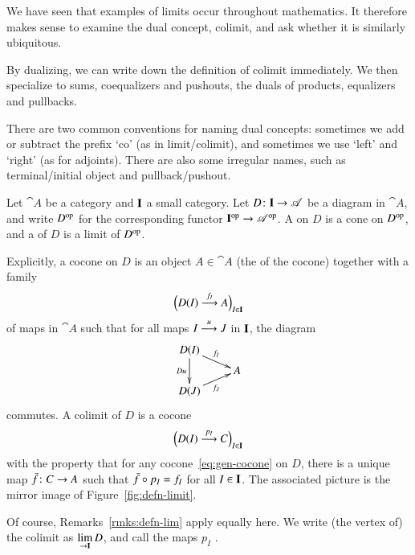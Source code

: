 We have seen that examples of limits occur throughout mathematics.  It
therefore makes sense to examine the dual concept, colimit, and ask whether
it is similarly ubiquitous.

By dualizing, we can write down the definition of colimit immediately.  We
then specialize to sums, coequalizers and pushouts, the duals of products,
equalizers and pullbacks.

There are two common conventions for naming dual%
%
%
concepts: sometimes we add or subtract the prefix `co' (as in
limit/colimit), and sometimes we use `left' and `right' (as for adjoints).
There are also some irregular names, such as terminal/initial object and
pullback/pushout.

\begin{defn}
Let $\cat{A}$ be a category and $\mathbf{I}$ a small category.  Let $D\from
\scat{I} \to \cat{A}$ be a diagram in $\cat{A}$, and write $D^{\mathrm{op}}$ for the
corresponding functor $\mathbf{I}^{\mathrm{op}} \to \mathscr{A}^{\mathrm{op}}$.  A %
%
%
on $D$ is a cone on $D^{\mathrm{op}}$, and a %
%
%
of $D$ is a limit of $D^{\mathrm{op}}$.
\end{defn}

Explicitly, a cocone on $D$ is an object $A \in \cat{A}$ (the
%
%
%
of the cocone) together with a family
%
\begin{equation}
\label{eq:gen-cocone}
\Bigl(
D(I) \stackrel{f_I}{\longrightarrow} A
\Bigr)_{I \in \mathbf{I}}
\end{equation}
%
of maps in $\cat{A}$ such that for all maps $I \stackrel{u}{\longrightarrow} J$ in $\mathbf{I}$, the
diagram
\[
\xymatrix@R=1ex{
D(I) \ar[dd]_{Du} \ar[rd]^{f_I} &       \\
                                &A      \\
D(J) \ar[ru]_{f_J}
}
\]
commutes.  A colimit of $D$ is a cocone
\[
\Bigl(D(I) \stackrel{p_I}{\longrightarrow} C\Bigr)_{I \in \mathbf{I}}
\]
with the property that for any cocone~\eqref{eq:gen-cocone} on
$D$, there is a unique map $\bar{f}\from C \to A$%
%
%
such that $\bar{f} \mathbin{\circ} p_I = f_I$ for all $I \in \mathbf{I}$.  The associated
picture is the mirror image of Figure~\ref{fig:defn-limit}.

Of course, Remarks~\ref{rmks:defn-lim} apply equally here.  We write (the
vertex of) the colimit as $\lim\limits_{\rightarrow \mathbf{I}} D$,%
%
%
and call the maps $p_I$ .%
%
%



